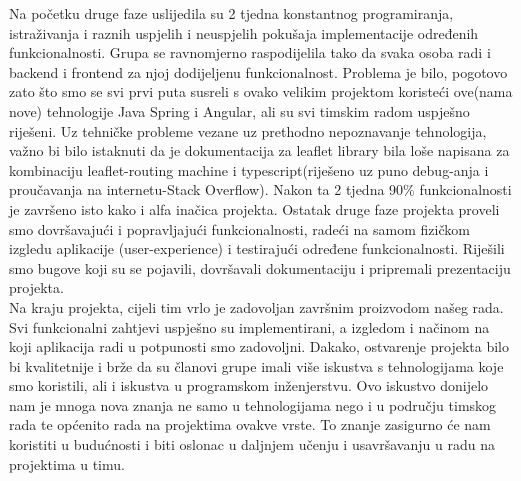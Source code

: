 		 \textnormal{Na početku druge faze uslijedila su 2 tjedna konstantnog programiranja, istraživanja i raznih uspjelih i neuspjelih pokušaja implementacije određenih funkcionalnosti. Grupa se ravnomjerno raspodijelila tako da svaka osoba radi i backend i frontend za njoj dodijeljenu funkcionalnost. Problema je bilo, pogotovo zato što smo se svi prvi puta susreli s ovako velikim projektom koristeći ove(nama nove) tehnologije Java Spring i Angular, ali su svi timskim radom uspješno riješeni. Uz tehničke probleme vezane uz prethodno nepoznavanje tehnologija, važno bi bilo istaknuti da je dokumentacija za leaflet library bila loše napisana za kombinaciju leaflet-routing machine i typescript(riješeno uz puno debug-anja i proučavanja na internetu-Stack Overflow). Nakon ta 2 tjedna 90\% funkcionalnosti je završeno isto kako i alfa inačica projekta. Ostatak druge faze projekta proveli smo dovršavajući i popravljajući funkcionalnosti, radeći na samom fizičkom izgledu aplikacije (user-experience) i testirajući određene funkcionalnosti. Riješili smo bugove koji su se pojavili, dovršavali dokumentaciju i pripremali prezentaciju projekta.}\\
		 
		 \textnormal{Na kraju projekta, cijeli tim vrlo je zadovoljan završnim proizvodom našeg rada. Svi funkcionalni zahtjevi uspješno su implementirani, a izgledom i načinom na koji aplikacija radi u potpunosti smo zadovoljni. Dakako, ostvarenje projekta bilo bi kvalitetnije i brže da su članovi grupe imali više iskustva s tehnologijama koje smo koristili, ali i iskustva u programskom inženjerstvu. Ovo iskustvo donijelo nam je mnoga nova znanja ne samo u tehnologijama nego i u području timskog rada te općenito rada na projektima ovakve vrste. To znanje zasigurno će nam koristiti u budućnosti i biti oslonac u daljnjem učenju i usavršavanju u radu na projektima u timu.}\\
		
		\eject 
